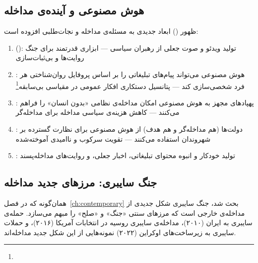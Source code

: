 \subsection{هوش مصنوعی و آینده‌ی مداخله}
\label{subsec:ch14-ai}

ظهور  () ابعاد جدیدی به مسئله‌ی مداخله و نجات‌طلبی افزوده است:

\begin{tcolorbox}[defbox, title={هوش مصنوعی و مداخله: ابعاد نوین}]
\begin{enumerate}
\item {} (): تولید ویدئو و صوت جعلی از رهبران سیاسی — ابزاری قدرتمند برای جنگ روایت‌ها و بی‌ثبات‌سازی

\item {}: هوش مصنوعی می‌تواند پیام‌های تبلیغاتی را بر اساس پروفایل روان‌شناختی هر فرد شخصی‌سازی کند — پتانسیل دستکاری افکار عمومی در مقیاسی بی‌سابقه\footnote{}

\item {}: پهپادهای مجهز به هوش مصنوعی امکان مداخله‌ی نظامی «بدون انسان» را فراهم می‌کنند — کاهش هزینه‌ی سیاسی مداخله برای مداخله‌گر

\item {}: دولت‌ها (هم مداخله‌گر و هم هدف) از هوش مصنوعی برای نظارت گسترده بر شهروندان استفاده می‌کنند — تقویت سرکوب و ناامیدی آموخته‌شده

\item {}: تولید خودکار و انبوه محتوای تبلیغاتی، اخبار جعلی، و روایت‌های مداخله‌پسند
\end{enumerate}
\end{tcolorbox}

\subsection{جنگ سایبری: مرزهای جدید مداخله}
\label{subsec:ch14-cyber}

همان‌گونه که در فصل~\ref{ch:contemporary} بحث شد، جنگ سایبری شکل جدیدی از مداخله‌ی خارجی است که مرزهای سنتی «جنگ» و «صلح» را مبهم می‌سازد. حمله‌ی سایبری  به ایران (۲۰۱۰)، مداخله‌ی سایبری روسیه در انتخابات آمریکا (۲۰۱۶)، و حملات سایبری به زیرساخت‌های اوکراین (۲۰۲۲) نمونه‌هایی از این شکل جدید مداخله‌اند.

